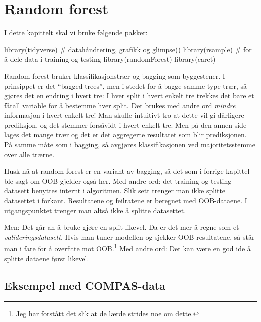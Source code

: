 \documentclass[
  letterpaper,
  DIV=11,
  numbers=noendperiod]{scrreprt}
\newenvironment{Shaded}{\begin{snugshade}}{\end{snugshade}}
\newcommand{\CommentTok}[1]{\textcolor[rgb]{0.37,0.37,0.37}{#1}}
\newcommand{\FunctionTok}[1]{\textcolor[rgb]{0.28,0.35,0.67}{#1}}
\newcommand{\NormalTok}[1]{\textcolor[rgb]{0.00,0.23,0.31}{#1}}
\begin{document}

\chapter{Random forest}\label{random-forest}

I dette kapittelt skal vi bruke følgende pakker:

\begin{Shaded}
\begin{Highlighting}[]
\FunctionTok{library}\NormalTok{(tidyverse)   }\CommentTok{\# datahåndtering, grafikk og glimpse()}
\FunctionTok{library}\NormalTok{(rsample)     }\CommentTok{\# for å dele data i training og testing}
\FunctionTok{library}\NormalTok{(randomForest)}
\FunctionTok{library}\NormalTok{(caret)}
\end{Highlighting}
\end{Shaded}

Random forest bruker klassifikasjonstrær og bagging som byggestener. I
prinsippet er det ``bagged trees'', men i stedet for å bagge samme type
trær, så gjøres det en endring i hvert tre: I hver split i hvert enkelt
tre trekkes det bare et fåtall variable for å bestemme hver split. Det
brukes med andre ord \emph{mindre} informasjon i hvert enkelt tre! Man
skulle intuitivt tro at dette vil gi dårligere prediksjon, og det
stemmer forsåvidt i hvert enkelt tre. Men på den annen side lages det
mange trær og det er det aggregerte resultatet som blir prediksjonen. På
samme måte som i bagging, så avgjøres klassifikasjonen ved
majoritetsstemme over alle trærne.

Husk nå at random forest er en variant av bagging, så det som i forrige
kapittel ble sagt om OOB gjelder også her. Med andre ord: det training
og testing datasett benyttes internt i algoritmen. Slik sett trenger man
ikke splitte datasettet i forkant. Resultatene og feilratene er beregnet
med OOB-dataene. I utgangspunktet trenger man altså ikke å splitte
datasettet.

Men: Det går an å bruke gjøre en split likevel. Da er det mer å regne
som et \emph{valideringsdatasett}. Hvis man tuner modellen og sjekker
OOB-resultatene, så står man i fare for å overfitte mot OOB.\footnote{Jeg
  har forstått det slik at de lærde strides noe om dette.} Med andre
ord: Det kan være en god ide å splitte dataene først likevel.

\section{Eksempel med COMPAS-data}\label{eksempel-med-compas-data}
\end{document}
